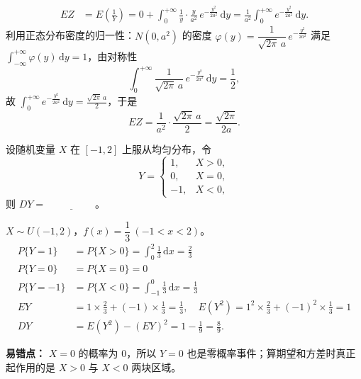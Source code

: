 ﻿\documentclass[lang=cn,11pt]{elegantbook}
\begin{document}
\begin{solution}
\[
\begin{aligned}
EZ &= E\!\left(\frac{1}{Y}\right) =0+ \int_0^{+\infty}\frac{1}{y}\cdot\frac{y}{a^2}\,e^{-\frac{y^2}{2a^2}}\,\mathrm{d}y = \frac{1}{a^2}\int_0^{+\infty}e^{-\frac{y^2}{2a^2}}\,\mathrm{d}y.
\end{aligned}
\]
利用正态分布密度的归一性：\(N(0,a^2)\) 的密度 \(\varphi(y) = \dfrac{1}{\sqrt{2\pi}\,a}\,e^{-\frac{y^2}{2a^2}}\) 满足 \(\displaystyle\int_{-\infty}^{+\infty}\varphi(y)\,\mathrm{d}y = 1\)，由对称性
\[
\int_0^{+\infty}\frac{1}{\sqrt{2\pi}\,a}\,e^{-\frac{y^2}{2a^2}}\,\mathrm{d}y = \frac{1}{2},
\]
故 \(\displaystyle\int_0^{+\infty}e^{-\frac{y^2}{2a^2}}\,\mathrm{d}y = \frac{\sqrt{2\pi}\,a}{2}\)，于是
\[
EZ = \frac{1}{a^2}\cdot\frac{\sqrt{2\pi}\,a}{2} = \frac{\sqrt{2\pi}}{2a}.
\]
\end{solution}


\begin{exercise}\label{exer:4-dy-seg}
设随机变量 \(X\) 在 \([-1,2]\) 上服从均匀分布，令
\[
Y = \begin{cases} 1, & X > 0, \\ 0, & X = 0, \\ -1, & X < 0, \end{cases}
\]
则 \(DY =\,\underline{\hspace{2cm}}\)。
\end{exercise}
\begin{solution}
\(X \sim U(-1,2)\)，\(f(x) = \dfrac{1}{3}\ (-1 < x < 2)\)。
\begin{align*}
P\{Y=1\} &= P\{X>0\} = \int_0^2 \frac{1}{3}\,\mathrm{d}x = \frac{2}{3}\\
P\{Y=0\} &= P\{X=0\} = 0\\
P\{Y=-1\} &= P\{X<0\} = \int_{-1}^0 \frac{1}{3}\,\mathrm{d}x = \frac{1}{3}\\
EY &= 1 \times \frac{2}{3} + (-1) \times \frac{1}{3} = \frac{1}{3},\quad E(Y^2) = 1^2 \times \frac{2}{3} + (-1)^2 \times \frac{1}{3} = 1\\
DY &= E(Y^2) - (EY)^2 = 1 - \frac{1}{9} = \frac{8}{9}.
\end{align*}
\begin{note}
\textbf{易错点：} \(X=0\) 的概率为 0，所以 \(Y=0\) 也是零概率事件；算期望和方差时真正起作用的是 \(X>0\) 与 \(X<0\) 两块区域。
\end{note}
\end{solution}
\end{document}
